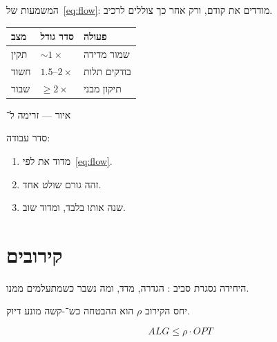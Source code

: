 המשמעות של~\eqref{eq:flow}: מודדים את  קודם, ורק אחר כך צוללים לרכיב.

\begin{tablebox}\centering\small
\begin{tabular}{@{}lll@{}}
\toprule
\textbf{מצב} & \textbf{סדר גודל} & \textbf{פעולה}\\
\midrule
תקין & $\sim 1\times$ & שמור מדידה\\
חשוד & $1.5$–$2\times$ & בודקים תלות\\
שבור & $\ge 2\times$ & תיקון מבני\\
\bottomrule
\end{tabular}
\end{tablebox}

\begin{tikzpic}
\end{tikzpic}
\begin{center}\small איור — זרימה ל־\end{center}

סדר עבודה:
\begin{enumerate}
\item[(\textbf{א})] מדוד את  לפי~\eqref{eq:flow}.
\item[(\textbf{ב})] זהה גורם שולט אחד.
\item[(\textbf{ג})] שנה אותו בלבד, ומדוד שוב.
\end{enumerate}

\chapter{קירובים}
\label{ch:approx}

היחידה נסגרת סביב : הגדרה, מדד, ומה נשבר כשמתעלמים ממנו.

\begin{keybox}[frametitle={רעיון מפתח — קירובים}]
יחס הקירוב $\rho$ הוא ההבטחה כש־-קשה מונע דיוק.
\end{keybox}

\begin{equation}
\label{eq:approx}
ALG \le \rho\cdot OPT
\end{equation}

